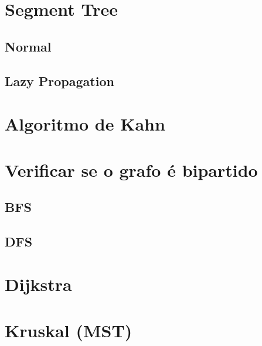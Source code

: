 \documentclass{article}
\begin{document}
\section{Segment Tree}
\subsection{Normal}


\subsection{Lazy Propagation}


\section{Algoritmo de Kahn}


\section{Verificar se o grafo é bipartido}
\subsection{BFS}


\subsection{DFS}


\section{Dijkstra}


\section{Kruskal (MST)}

\end{document}
